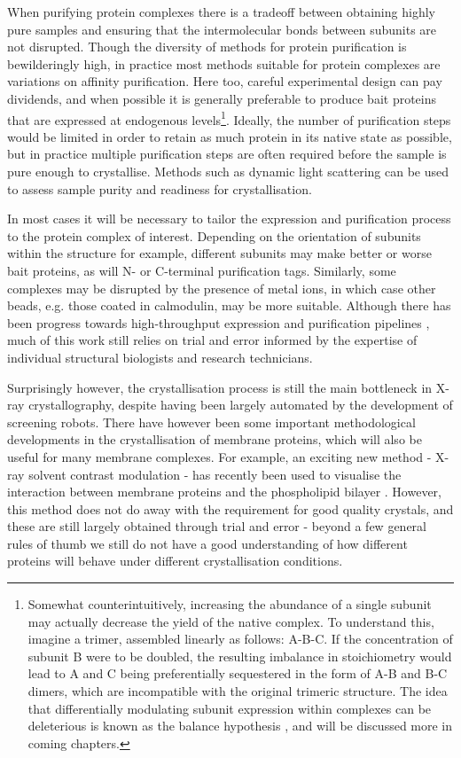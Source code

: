 \documentclass[a4paper,11pt,twoside,openright]{scrbook}
\begin{document}
When purifying protein complexes there is a tradeoff between obtaining highly pure samples and ensuring that the intermolecular bonds between subunits are not disrupted. Though the diversity of methods for protein purification is bewilderingly high, in practice most methods suitable for protein complexes are variations on affinity purification. Here too, careful experimental design can pay dividends, and when possible it is generally preferable to produce bait proteins that are expressed at endogenous levels\footnote{Somewhat counterintuitively, increasing the abundance of a single subunit may actually decrease the yield of the native complex. To understand this, imagine a trimer, assembled linearly as follows: A-B-C. If the concentration of subunit B were to be doubled, the resulting imbalance in stoichiometry would lead to A and C being preferentially sequestered in the form of A-B and B-C dimers, which are incompatible with the original trimeric structure. The idea that differentially modulating subunit expression within complexes can be deleterious is known as the balance hypothesis \cite{Papp2003}, and will be discussed more in coming chapters.}. Ideally, the number of purification steps would be limited in order to retain as much protein in its native state as possible, but in practice multiple purification steps are often required before the sample is pure enough to crystallise. Methods such as dynamic light scattering \cite{Ni2013} can be used to assess sample purity and readiness for crystallisation.

In most cases it will be necessary to tailor the expression and purification process to the protein complex of interest. Depending on the orientation of subunits within the structure for example, different subunits may make better or worse bait proteins, as will N- or C-terminal purification tags. Similarly, some complexes may be disrupted by the presence of metal ions, in which case other beads, e.g. those coated in calmodulin, may be more suitable. Although there has been progress towards high-throughput expression and purification pipelines \cite{Jia2016}, much of this work still relies on trial and error informed by the expertise of individual structural biologists and research technicians.

Surprisingly however, the crystallisation process is still the main bottleneck in X-ray crystallography, despite having been largely automated by the development of screening robots. There have however been some important methodological developments in the crystallisation of membrane proteins, which will also be useful for many membrane complexes. For example, an exciting new method - X-ray solvent contrast modulation - has recently been used to visualise the interaction between membrane proteins and the phospholipid bilayer \cite{Norimatsu2017}. However, this method does not do away with the requirement for good quality crystals, and these are still largely obtained through trial and error - beyond a few general rules of thumb we still do not have a good understanding of how different proteins will behave under different crystallisation conditions.
\end{document}
